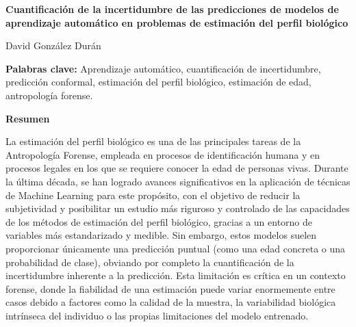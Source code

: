 

%

\cleardoublepage
\thispagestyle{empty}

\begin{center}
    {\large\bfseries Cuantificación de la incertidumbre de las predicciones de modelos de aprendizaje automático en problemas de estimación del perfil biológico}
\end{center}
\begin{center}
    David González Durán
\end{center}

\vspace{0.7cm}

\noindent\textbf{Palabras clave:} Aprendizaje automático, cuantificación de incertidumbre, predicción conformal, estimación del perfil biológico, estimación de edad, antropología forense.

\vspace{0.7cm}

\noindent\textbf{Resumen}

La estimación del perfil biológico es una de las principales tareas de la Antropología Forense, empleada en procesos de identificación humana y en procesos legales en los que se requiere conocer la edad de personas vivas. Durante la última década, se han logrado avances significativos en la aplicación de técnicas de Machine Learning para este propósito, con el objetivo de reducir la subjetividad y posibilitar un estudio más riguroso y controlado de las capacidades de los métodos de estimación del perfil biológico, gracias a un entorno de variables más estandarizado y medible. Sin embargo, estos modelos suelen proporcionar únicamente una predicción puntual (como una edad concreta o una probabilidad de clase), obviando por completo la cuantificación de la incertidumbre inherente a la predicción. Esta limitación es crítica en un contexto forense, donde la fiabilidad de una estimación puede variar enormemente entre casos debido a factores como la calidad de la muestra, la variabilidad biológica intrínseca del individuo o las propias limitaciones del modelo entrenado.

